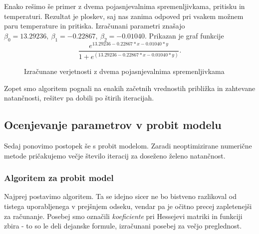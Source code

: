 \documentclass[12pt,a4paper]{amsart}
\theoremstyle{definition} %
\theoremstyle{plain} %
\begin{document}
Enako rešimo še primer z dvema pojasnjevalnima spremenljivkama, pritisku in temperaturi. Rezultat je ploskev, saj nas zanima odpoved pri vsakem možnem
paru temperature in pritiska. Izračunani parametri znašajo $\beta_{0} = 13.29236,~\beta_{1} = -0.22867,~\beta_{2} = -0.01040.$ Prikazan je graf funkcije
\[
    \frac{e^{13.29236 -0.22867*x-0.01040*y}}{1+e^{(13.29236 -0.22867*x-0.01040*y)}}.
\]
\begin{center}
\begin{figure}[H]
\caption{Izračunane verjetnosti z dvema pojasnjevalnima spremenljivkama}
\end{figure}
\end{center}
Zopet smo algoritem pognali na enakih začetnih vrednostih približka in zahtevane natančnosti, rešitev pa dobili po štirih iteracijah.

\subsection{Ocenjevanje parametrov v probit modelu}
Sedaj ponovimo postopek še s probit modelom. Zaradi neoptimizirane numerične metode pričakujemo večje število iteracij za doseženo želeno natančnost.

\subsubsection{Algoritem za probit model}
Najprej postavimo algoritem. Ta se idejno sicer ne bo bistveno razlikoval od tistega uporabljenega v prejšnjem odseku, vendar pa je očitno precej zapletenejši za računanje.
Posebej smo označili \textit{koeficiente} pri Hessejevi matriki in funkciji zbira - to so le deli dejanske formule, izračunani posebej za večjo preglednost.
\end{document}
